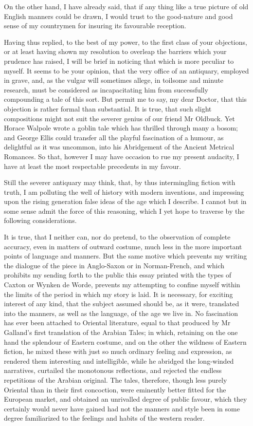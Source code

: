 On the other hand, I have already said, that if any thing like a true
picture of old English manners could be drawn, I would trust to the
good-nature and good sense of my countrymen for insuring its favourable
reception.

Having thus replied, to the best of my power, to the first class of your
objections, or at least having shown my resolution to overleap the
barriers which your prudence has raised, I will be brief in noticing
that which is more peculiar to myself. It seems to be your opinion, that
the very office of an antiquary, employed in grave, and, as the vulgar
will sometimes allege, in toilsome and minute research, must be
considered as incapacitating him from successfully compounding a tale of
this sort. But permit me to say, my dear Doctor, that this objection is
rather formal than substantial. It is true, that such slight
compositions might not suit the severer genius of our friend Mr Oldbuck.
Yet Horace Walpole wrote a goblin tale which has thrilled through many a
bosom; and George Ellis could transfer all the playful fascination of a
humour, as delightful as it was uncommon, into his Abridgement of the
Ancient Metrical Romances. So that, however I may have occasion to rue
my present audacity, I have at least the most respectable precedents in
my favour.

Still the severer antiquary may think, that, by thus intermingling
fiction with truth, I am polluting the well of history with modern
inventions, and impressing upon the rising generation false ideas of the
age which I describe. I cannot but in some sense admit the force of this
reasoning, which I yet hope to traverse by the following considerations.

It is true, that I neither can, nor do pretend, to the observation of
complete accuracy, even in matters of outward costume, much less in the
more important points of language and manners. But the same motive which
prevents my writing the dialogue of the piece in Anglo-Saxon or in
Norman-French, and which prohibits my sending forth to the public this
essay printed with the types of Caxton or Wynken de Worde, prevents my
attempting to confine myself within the limits of the period in which my
story is laid. It is necessary, for exciting interest of any kind, that
the subject assumed should be, as it were, translated into the manners,
as well as the language, of the age we live in. No fascination has ever
been attached to Oriental literature, equal to that produced by Mr
Galland's first translation of the Arabian Tales; in which, retaining on
the one hand the splendour of Eastern costume, and on the other the
wildness of Eastern fiction, he mixed these with just so much ordinary
feeling and expression, as rendered them interesting and intelligible,
while he abridged the long-winded narratives, curtailed the monotonous
reflections, and rejected the endless repetitions of the Arabian
original. The tales, therefore, though less purely Oriental than in
their first concoction, were eminently better fitted for the European
market, and obtained an unrivalled degree of public favour, which they
certainly would never have gained had not the manners and style been in
some degree familiarized to the feelings and habits of the western
reader.


